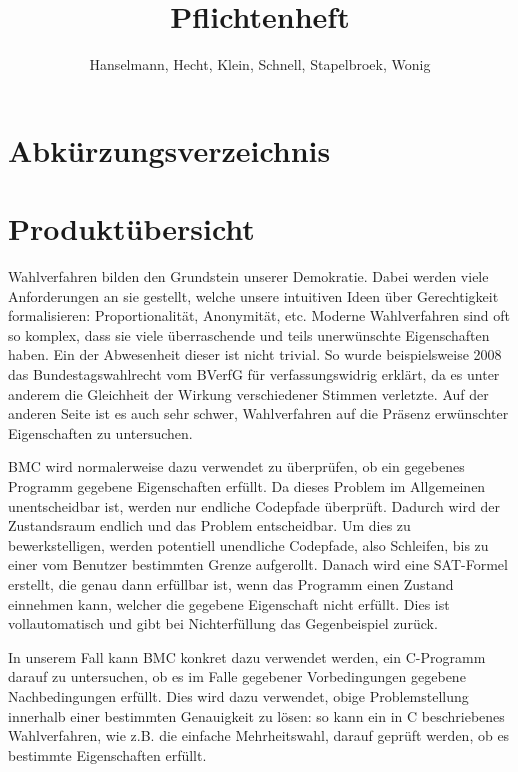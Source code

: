 \documentclass[a4paper]{scrreprt}
\begin{document}
\title{Pflichtenheft}
\author{Hanselmann, Hecht, Klein, Schnell, Stapelbroek, Wonig}
\maketitle 

\tableofcontents	

\listoffigures

\chapter*{Abkürzungsverzeichnis}
\begin{acronym} %
\end{acronym}
 
\chapter{Produktübersicht}
Wahlverfahren bilden den Grundstein unserer Demokratie. Dabei werden viele Anforderungen an sie gestellt, welche unsere intuitiven Ideen über Gerechtigkeit formalisieren: Proportionalität, Anonymität, etc. Moderne Wahlverfahren sind oft so komplex, dass sie viele überraschende und teils unerwünschte Eigenschaften haben. Ein der Abwesenheit dieser ist nicht trivial. So wurde beispielsweise 2008 das Bundestagswahlrecht vom BVerfG für verfassungswidrig erklärt, da es unter anderem die Gleichheit der Wirkung verschiedener Stimmen verletzte. Auf der anderen Seite ist es auch sehr schwer, Wahlverfahren auf die Präsenz erwünschter Eigenschaften zu untersuchen.

\ac{BMC} wird normalerweise dazu verwendet zu überprüfen, ob ein gegebenes Programm gegebene Eigenschaften erfüllt. Da dieses Problem im Allgemeinen unentscheidbar ist, werden nur endliche Codepfade überprüft. Dadurch wird der Zustandsraum endlich und das Problem entscheidbar. Um dies zu bewerkstelligen, werden potentiell unendliche Codepfade, also Schleifen, bis zu einer vom \gls{Benutzer} bestimmten Grenze aufgerollt. Danach wird eine SAT-Formel erstellt, die genau dann erfüllbar ist,	 wenn das Programm einen Zustand einnehmen kann, welcher die gegebene Eigenschaft nicht erfüllt. Dies ist vollautomatisch und gibt bei Nichterfüllung das Gegenbeispiel zurück.  

In unserem Fall kann \ac{BMC} konkret dazu verwendet werden, ein C-Programm darauf zu untersuchen, ob es im Falle gegebener Vorbedingungen gegebene Nachbedingungen erfüllt. Dies wird dazu verwendet, obige Problemstellung innerhalb einer bestimmten Genauigkeit zu lösen: so kann ein in C beschriebenes Wahlverfahren, wie z.B. die einfache Mehrheitswahl, darauf geprüft werden, ob es bestimmte Eigenschaften erfüllt.
\end{document}
